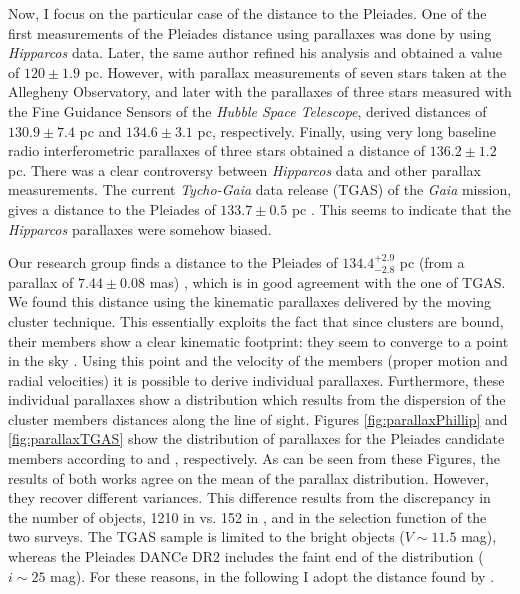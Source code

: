 Now, I focus on the particular case of the distance to the Pleiades. One of the first measurements of the Pleiades distance using parallaxes was done by \citet{1999A&A...341L..71V} using \emph{Hipparcos} data.{ Later, the same author \citep{2009A&A...497..209V} refined his analysis and obtained a value of $120\pm1.9$ pc. However, \citet{2000ApJ...533..938G} with parallax measurements of seven stars taken at the Allegheny Observatory, and later \citet{2005AJ....129.1616S} with the parallaxes of three stars measured with the Fine Guidance Sensors of the \emph{Hubble Space Telescope}, derived distances of $130.9\pm7.4$ pc and $134.6\pm3.1$ pc, respectively. Finally, \citet{2014Sci...345.1029M} using very long baseline radio interferometric parallaxes of three stars obtained a distance of $136.2\pm1.2$ pc.} There was a clear controversy between \emph{Hipparcos} data and other parallax measurements. The current \emph{Tycho-Gaia} data release (TGAS) of the \emph{Gaia} mission, gives a distance to the Pleiades of $133.7\pm0.5$ pc \cite[from a parallax of $7.48\pm0.03$ mas][]{2017A&A...601A..19G}. This seems to indicate that the \emph{Hipparcos} parallaxes were somehow biased.

Our research group finds a distance to the Pleiades of $134.4^{+2.9}_{-2.8} $ pc (from a parallax of $7.44\pm0.08$ mas) \citep{Galli2017}, which is in good agreement with the one of TGAS. We found this distance using the kinematic parallaxes delivered by the moving cluster technique. This essentially exploits the fact that since clusters are bound, their members show a clear kinematic footprint: they seem to converge to a point in the sky \citep{1964IAUS...20...50B}. Using this point and the velocity of the members (proper motion and radial velocities) it is possible to derive individual parallaxes. Furthermore, these individual parallaxes show a distribution which results from the dispersion of the cluster members distances along the line of sight. Figures \ref{fig:parallaxPhillip} and \ref{fig:parallaxTGAS} show the distribution of parallaxes for the Pleiades candidate members according to \citet{Galli2017} and \citet{2017A&A...601A..19G}, respectively. As can be seen from these Figures, the results of both works agree on the mean of the parallax distribution. However, they recover different variances. This difference results from the discrepancy in the number of objects, 1210 in \citet{Galli2017} vs. 152 in \citet{2017A&A...601A..19G}, and in the selection function of the two surveys. The TGAS sample is limited to the bright objects ($V \sim 11.5$ mag), whereas the Pleiades DANCe DR2 includes the faint end of the distribution ($i\sim25$ mag). For these reasons, in the following I adopt the distance found by \citet{Galli2017}.

